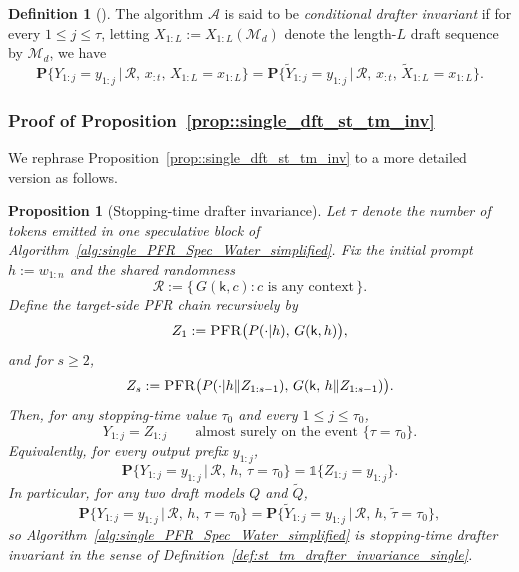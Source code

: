 \documentclass{article}
\theoremstyle{plain}
\newtheorem{proposition}[theorem]{Proposition}
\theoremstyle{definition}
\newtheorem{definition}[theorem]{Definition}
\begin{document}
\begin{definition}[\citep{rowan2025list}]
\label{def:conditional_drafter_invariance_single}
The algorithm $\mathcal{A}$ is said to be \emph{conditional drafter invariant} if for every $1\le j\le \tau$, letting $X_{1:L} := X_{1:L}(\mathcal{M}_d)$ denote the length-$L$ draft sequence by $\mathcal{M}_d$, we have
\begin{equation*}
\mathbf{P}\big\{
Y_{1:j}=y_{1:j}\,\big|\,\mathcal{R},\,x_{:t},\,X_{1:L}=x_{1:L}
\big\}  =
\mathbf{P}\big\{
\widetilde{Y}_{1:j}=y_{1:j}\,\big|\,\mathcal{R},\,x_{:t},\,\widetilde{X}_{1:L}=x_{1:L}
\big\}. 
\end{equation*}
\end{definition}



\subsubsection{Proof of Proposition~\ref{prop::single_dft_st_tm_inv}}
\label{subsubapp::proof_single_dft_st_tm_inv}

We rephrase Proposition~\ref{prop::single_dft_st_tm_inv} to a more detailed version as follows. 


\begin{proposition}[Stopping-time drafter invariance]
\label{prop:single_pfr_stopping_time_invariance}
Let $\tau$ denote the number of tokens emitted in one speculative block of
Algorithm~\ref{alg:single_PFR_Spec_Water_simplified}. 
Fix the initial prompt $h:=w_{1:n}$ and the shared randomness
\[
\mathcal{R}:=\{\,G(\mathsf{k},c): c \text{ is any context}\,\}.
\]
Define the \emph{target-side PFR chain} recursively by
\[
Z_1:=\textsc{PFR}\bigl(P(\cdot | h),\,G(\mathsf{k},h)\bigr),
\]
and for $s\ge 2$,
\[
Z_s:=\textsc{PFR}\bigl(P(\cdot | h\|Z_{1:s-1}),\,G(\mathsf{k},\,h\|Z_{1:s-1})\bigr).
\]
Then, for any stopping-time value $\tau_0$ and every $1\le j\le \tau_0$,
\[
Y_{1:j}=Z_{1:j}
\qquad\text{almost surely on the event }\{\tau=\tau_0\}.
\]
Equivalently, for every output prefix $y_{1:j}$,
\[
\mathbf{P}\bigl\{
Y_{1:j}=y_{1:j}\,\big|\,\mathcal{R},\,h,\,\tau=\tau_0
\bigr\}
=
\mathds{1}\{Z_{1:j}=y_{1:j}\}.
\]
In particular, for any two draft models $Q$ and $\widetilde Q$,
\[
\mathbf{P}\bigl\{
Y_{1:j}=y_{1:j}\,\big|\,\mathcal{R},\,h,\,\tau=\tau_0
\bigr\}
=
\mathbf{P}\bigl\{
\widetilde Y_{1:j}=y_{1:j}\,\big|\,\mathcal{R},\,h,\,\widetilde\tau=\tau_0
\bigr\},
\]
so Algorithm~\ref{alg:single_PFR_Spec_Water_simplified} is stopping-time drafter invariant in the sense of Definition~\ref{def:st_tm_drafter_invariance_single}.
\end{proposition}
\end{document}
